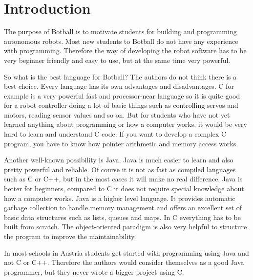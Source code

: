 \documentclass{juniorjournal}
\author[1, \corresp]{Markus Klein}\correspemail{m@mklein.co.at}
\author[1]{Christoph Hackenberger}
\affil[1]{Vienna Institute of Technology (TGM)}
\begin{document}
\maketitle

\articleabstract{}

\section{Introduction}
The purpose of Botball\cite{Botball} is to motivate students for building and programming autonomous robots.
Most new students to Botball\cite{Botball} do not have any experience with programming.
Therefore the way of developing the robot software has to be very beginner friendly and easy to use, 
but at the same time very powerful.

So what is the best language for Botball\cite{Botball}?
The authors do not think there is a best choice.
Every language has its own advantages and disadvantages.
C for example is a very powerful fast and processor-near language so it is quite good for a robot 
controller doing a lot of basic things such as controlling servos and motors, reading sensor values 
and so on. 
But for students who have not yet learned anything about programming or how a computer works, 
it would be very hard to learn and understand C code. 
If you want to develop a complex C program, you have to know how pointer arithmetic and memory 
access works.

Another well-known possibility is Java\cite{Java}. 
Java\cite{Java} is much easier to learn and also pretty powerful and reliable.
Of course it is not as fast as compiled languages such as C or C++, 
but in the most cases it will make no real difference.
Java\cite{Java} is better for beginners, 
compared to C it does not require special knowledge about how a computer works.
Java\cite{Java} is a higher level language.
It provides automatic garbage collection to handle memory management 
and offers an excellent set of basic data structures such as lists, queues and maps.
In C everything has to be built from scratch.
The object-oriented paradigm is also very helpful to structure the program 
to improve the maintainability.

In most schools in Austria students get started with programming using Java\cite{Java} and not C or C++.
Therefore the authors would consider themselves as a good Java\cite{Java} programmer, 
but they never wrote a bigger project using C.
\end{document}

